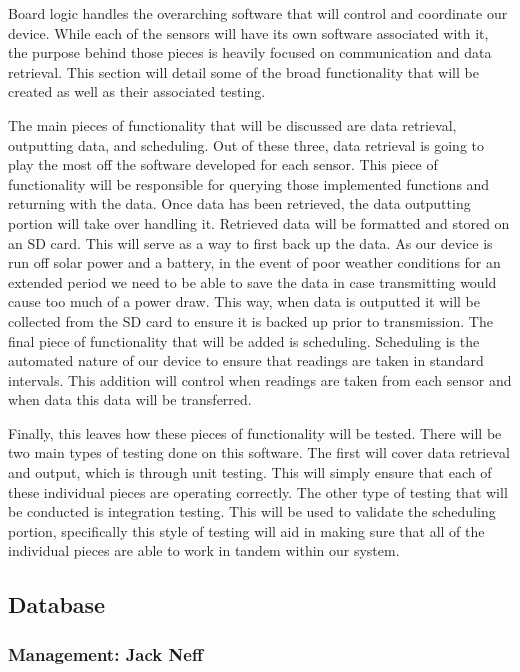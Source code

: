\documentclass[IEEEtran,letterpaper,10pt,titlepage,fleqn,draftclsnofoot,onecolumn]{article}
\begin{document}
Board logic handles the overarching software that will control and coordinate our device. While each of the sensors will have its own software associated with it, the purpose behind those pieces is heavily focused on communication and data retrieval. This section will detail some of the broad functionality that will be created as well as their associated testing.

The main pieces of functionality that will be discussed are data retrieval, outputting data, and scheduling. Out of these three, data retrieval is going to play the most off the software developed for each sensor. This piece of functionality will be responsible for querying those implemented functions and returning with the data. Once data has been retrieved, the data outputting portion will take over handling it. Retrieved data will be formatted and stored on an SD card. This will serve as a way to first back up the data. As our device is run off solar power and a battery, in the event of poor weather conditions for an extended period we need to be able to save the data in case transmitting would cause too much of a power draw. This way, when data is outputted it will be collected from the SD card to ensure it is backed up prior to transmission. The final piece of functionality that will be added is scheduling. Scheduling is the automated nature of our device to ensure that readings are taken in standard intervals. This addition will control when readings are taken from each sensor and when data this data will be transferred.  

Finally, this leaves how these pieces of functionality will be tested. There will be two main types of testing done on this software. The first will cover data retrieval and output, which is through unit testing. This will simply ensure that each of these individual pieces are operating correctly. The other type of testing that will be conducted is integration testing. This will be used to validate the scheduling portion, specifically this style of testing will aid in making sure that all of the individual pieces are able to work in tandem within our system.

\subsection{Database}
\subsubsection{Management: Jack Neff}
\end{document}
